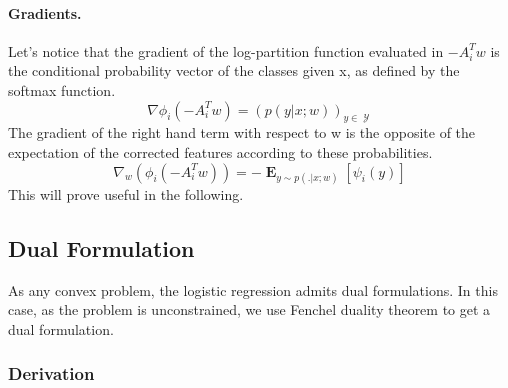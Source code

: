 \documentclass{article}
\DeclareMathOperator{\1}{\mathbb{1}}
\DeclareMathOperator{\E}{\mathbf{E}}
\DeclareMathOperator{\Y}{\mathcal{Y}}
\begin{document}
\paragraph{Gradients.}
Let's notice that the gradient of the log-partition function evaluated in $-A_i^Tw$ is the conditional probability vector of the classes given x, as defined by the softmax function.
\begin{equation}
	\nabla \phi_i(-A_i^Tw) = (p(y | x ; w))_{y \in \Y}
\end{equation}
The gradient of the right hand term with respect to w is the opposite of the expectation of the corrected features according to these probabilities.
\begin{equation}
	\label{primal gradient}
	\nabla_w (\phi_i(-A_i^Tw)) = - \E_{y \sim p(. | x ; w)} [\psi_i(y)]
\end{equation}
This will prove useful in the following.



\subsection{Dual Formulation}

As any convex problem, the logistic regression admits dual formulations.
In this case, as the problem is unconstrained, we use Fenchel duality theorem to get a dual formulation.

\subsubsection{Derivation}
\end{document}
